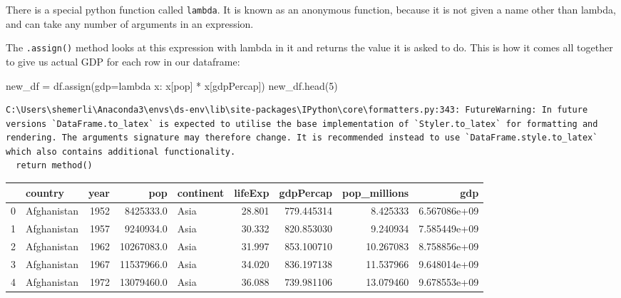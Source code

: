 \documentclass[
  letterpaper,
  DIV=11,
  numbers=noendperiod]{scrreprt}
\newenvironment{Shaded}{\begin{snugshade}}{\end{snugshade}}
\newcommand{\DecValTok}[1]{\textcolor[rgb]{0.68,0.00,0.00}{#1}}
\newcommand{\KeywordTok}[1]{\textcolor[rgb]{0.00,0.23,0.31}{#1}}
\newcommand{\NormalTok}[1]{\textcolor[rgb]{0.00,0.23,0.31}{#1}}
\newcommand{\OperatorTok}[1]{\textcolor[rgb]{0.37,0.37,0.37}{#1}}
\newcommand{\StringTok}[1]{\textcolor[rgb]{0.13,0.47,0.30}{#1}}
\begin{document}
There is a special python function called \texttt{lambda}. It is known
as an anonymous function, because it is not given a name other than
lambda, and can take any number of arguments in an expression.

The \texttt{.assign()} method looks at this expression with lambda in it
and returns the value it is asked to do. This is how it comes all
together to give us actual GDP for each row in our dataframe:

\begin{Shaded}
\begin{Highlighting}[]
\NormalTok{new\_df }\OperatorTok{=}\NormalTok{ df.assign(gdp}\OperatorTok{=}\KeywordTok{lambda}\NormalTok{ x: x[}\StringTok{\textquotesingle{}pop\textquotesingle{}}\NormalTok{] }\OperatorTok{*}\NormalTok{ x[}\StringTok{\textquotesingle{}gdpPercap\textquotesingle{}}\NormalTok{])}
\NormalTok{new\_df.head(}\DecValTok{5}\NormalTok{)}
\end{Highlighting}
\end{Shaded}

\begin{verbatim}
C:\Users\shemerli\Anaconda3\envs\ds-env\lib\site-packages\IPython\core\formatters.py:343: FutureWarning: In future versions `DataFrame.to_latex` is expected to utilise the base implementation of `Styler.to_latex` for formatting and rendering. The arguments signature may therefore change. It is recommended instead to use `DataFrame.style.to_latex` which also contains additional functionality.
  return method()
\end{verbatim}

\begin{tabular}{llrrlrrrr}
\toprule
{} &      country &  year &         pop & continent &  lifeExp &   gdpPercap &  pop\_millions &           gdp \\
\midrule
0 &  Afghanistan &  1952 &   8425333.0 &      Asia &   28.801 &  779.445314 &      8.425333 &  6.567086e+09 \\
1 &  Afghanistan &  1957 &   9240934.0 &      Asia &   30.332 &  820.853030 &      9.240934 &  7.585449e+09 \\
2 &  Afghanistan &  1962 &  10267083.0 &      Asia &   31.997 &  853.100710 &     10.267083 &  8.758856e+09 \\
3 &  Afghanistan &  1967 &  11537966.0 &      Asia &   34.020 &  836.197138 &     11.537966 &  9.648014e+09 \\
4 &  Afghanistan &  1972 &  13079460.0 &      Asia &   36.088 &  739.981106 &     13.079460 &  9.678553e+09 \\
\bottomrule
\end{tabular}
\end{document}
